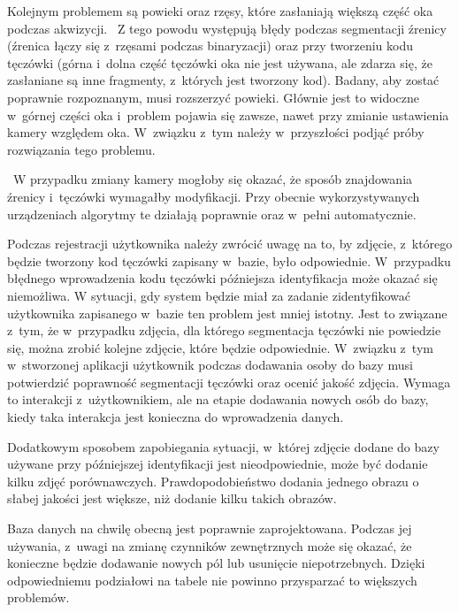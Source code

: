 Kolejnym problemem są powieki oraz rzęsy, które zasłaniają większą część oka podczas akwizycji. ~Z tego powodu występują błędy podczas segmentacji źrenicy (źrenica łączy się z~rzęsami podczas binaryzacji) oraz przy tworzeniu kodu tęczówki (górna i~dolna część tęczówki oka nie jest używana, ale zdarza się, że zasłaniane są inne fragmenty, z~których jest tworzony kod). Badany, aby zostać poprawnie rozpoznanym, musi rozszerzyć powieki. Głównie jest to widoczne w~górnej części oka i~problem pojawia się zawsze, nawet przy zmianie ustawienia kamery względem oka. W~związku z~tym należy w~przyszłości podjąć próby rozwiązania tego problemu.

~W przypadku zmiany kamery mogłoby się okazać, że sposób znajdowania źrenicy i~tęczówki wymagałby modyfikacji. Przy obecnie wykorzystywanych urządzeniach algorytmy te działają poprawnie oraz w~pełni automatycznie.

Podczas rejestracji użytkownika należy zwrócić uwagę na to, by zdjęcie, z~którego będzie tworzony kod tęczówki zapisany w~bazie, było odpowiednie. W~przypadku błędnego wprowadzenia kodu tęczówki późniejsza identyfikacja może okazać się niemożliwa. W sytuacji, gdy system będzie miał za zadanie zidentyfikować użytkownika zapisanego w~bazie ten problem jest mniej istotny. Jest to związane z~tym, że w~przypadku zdjęcia, dla którego segmentacja tęczówki nie powiedzie się, można zrobić kolejne zdjęcie, które będzie odpowiednie. W~związku z~tym w~stworzonej aplikacji użytkownik podczas dodawania osoby do bazy musi potwierdzić poprawność segmentacji tęczówki oraz ocenić jakość zdjęcia. Wymaga to interakcji z~użytkownikiem, ale na etapie dodawania nowych osób do bazy, kiedy taka interakcja jest konieczna do wprowadzenia danych.

Dodatkowym sposobem zapobiegania sytuacji, w~której zdjęcie dodane do bazy używane przy późniejszej identyfikacji jest nieodpowiednie, może być dodanie kilku zdjęć porównawczych. Prawdopodobieństwo dodania jednego obrazu o słabej jakości jest większe, niż dodanie kilku takich obrazów.

Baza danych na chwilę obecną jest poprawnie zaprojektowana. Podczas jej używania, z~uwagi na zmianę czynników zewnętrznych może się okazać, że konieczne będzie dodawanie nowych pól lub usunięcie niepotrzebnych. Dzięki odpowiedniemu podziałowi na tabele nie powinno przysparzać to większych problemów.

